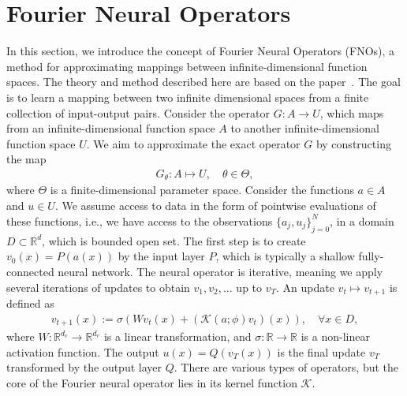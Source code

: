 


\section{Fourier Neural Operators}
In this section, we introduce the concept of Fourier Neural Operators (FNOs), a method for approximating mappings between infinite-dimensional function spaces.
The theory and method described here are based on the paper~\cite{FNO_2021}.
The goal is to learn a mapping between two infinite dimensional spaces from a finite collection of input-output pairs. 
Consider the operator $G: A \to U$, which maps from an infinite-dimensional function space $A$ to another infinite-dimensional function space $U$.
We aim to approximate the exact operator $G$ by constructing the map
\begin{align*}
    G_{\theta}: A \mapsto U, \quad \theta \in \Theta,
\end{align*} 
where $\Theta$ is a finite-dimensional parameter space.
Consider the functions $a \in A$ and $u \in U$.
We assume access to data in the form of pointwise evaluations of these functions, i.e., we have access to the observations ${\{a_j, u_j \}}_{j=0}^N$, in a domain $D \subset \mathbb{R}^d$, which is bounded open set.
The first step is to create $v_0(x) = P(a(x))$ by the input layer $P$, which is typically a shallow fully-connected neural network.
The neural operator is iterative, meaning we apply several iterations of updates to obtain $v_1, v_2, \ldots$ up to $v_T$.
An update $v_t \mapsto v_{t+1}$ is defined as
\begin{align}
    v_{t+1}(x) := \sigma \left( W v_t(x) + \left( \mathcal{K}(a;\phi)v_t \right) (x) \right), \quad \forall x \in D,
\end{align}
where $W: \mathbb{R}^{d_v} \to \mathbb{R}^{d_v}$ is a linear transformation, and $\sigma: \mathbb{R} \to \mathbb{R}$ is a non-linear activation function.
The output $u(x) = Q(v_T(x))$ is the final update $v_T$ transformed by the output layer $Q$.
There are various types of operators, but the core of the Fourier neural operator lies in its kernel function $\mathcal{K}$.
